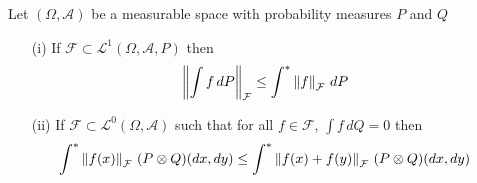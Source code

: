 \begin{lem}\label{JensenConsequencesForOuterExpectations}Let $(\Omega, \mathcal{A})$ be a measurable space with probability measures $P$ and $Q$
\begin{itemize}
\item[(i)]If $\mathcal{F} \subset \mathcal{L}^1(\Omega, \mathcal{A}, P)$ then 
\begin{align*}
\left \lVert \int f \, dP \right \rVert_{\mathcal{F}} &\leq \int^* \left \lVert f \right \rVert_{\mathcal{F}} \, dP
\end{align*}
\item[(ii)]If $\mathcal{F} \subset \mathcal{L}^0(\Omega, \mathcal{A})$  such that for all $f \in \mathcal{F}$,  $\int f \, dQ=0$ then
\begin{align*}
\int^* \left \lVert f(x) \right \rVert_{\mathcal{F}} \, (P \otimes Q)(dx,dy) &\leq \int^* \left \lVert f(x)+f(y) \right \rVert_{\mathcal{F}} \, (P \otimes Q)(dx,dy) 
\end{align*}
\end{itemize}
\end{lem}
